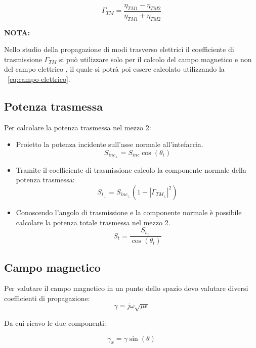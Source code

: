 \documentclass[10pt,a4paper]{report}
\begin{document}
			\[
			\Gamma_{TM}=\frac{\eta_{TM1}-\eta_{TM2}}{\eta_{TM1}+\eta_{TM2}}
			\]
		
			 
			 \textbf{ NOTA: }
			 
			 Nello studio della propagazione di modi trasverso elettrici il coefficiente di trasmissione $\Gamma_{TM}$ si può utilizzare solo per il calcolo del campo magnetico e non del campo elettrico , il quale si potrà poi essere calcolato utilizzando la ~\ref{eq:campo-elettrico}.

		\subsection{Potenza trasmessa}

			Per calcolare la potenza trasmessa nel mezzo 2:
			
			\begin{itemize}
			
			\item Proietto la potenza incidente sull'asse normale all'intefaccia.
			\begin{equation}
			S_{inc_\perp}=S_{inc}\cos(\theta_i)
			\end{equation}

			\item Tramite il coefficiente di trasmissione calcolo la componente normale della potenza trasmessa:
			\begin{equation}
			S_{t_\perp}=S_{inc_\perp}(1-|\Gamma_{TM_\perp}|^2)
			\end{equation}

			\item Conoscendo l'angolo di trasmissione e la componente normale è possibile calcolare la potenza totale trasmessa nel mezzo 2.
			\begin{equation}
			S_{t}=\frac{S_{t_\perp}}{\cos(\theta_t)}
			\end{equation}
			

			\end{itemize}
		

		\subsection{Campo magnetico}

			Per valutare il campo magnetico in un punto dello spazio devo valutare diversi coefficienti di propagazione:
			\[
			\gamma=j\omega\sqrt{\mu\epsilon}\]

			Da cui ricavo le due componenti:

			\[
			\gamma_x=\gamma\sin(\theta)
			\]
\end{document}
